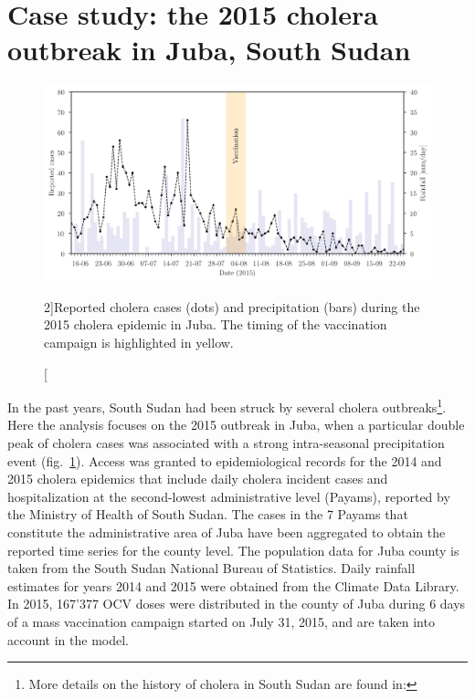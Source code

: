 \section{Case study: the 2015 cholera outbreak in Juba, South Sudan}\label{sec:data sets}
\begin{figure}\centering
  \includegraphics{fig_cholera-rainfall/Lemaitre_ACTROP_2018_42_R1_fig2.png}
  \caption[Cholera cases and precipitation during the 2015 cholera epidemic in Juba][2\baselineskip]{Reported cholera cases (dots) and precipitation (bars) during the 2015 cholera epidemic in Juba. The timing of the vaccination campaign is highlighted in yellow.}\label{fig:report}
\end{figure}
In the past years, South Sudan had been struck by several cholera outbreaks\footnote{More details on the history of cholera in South Sudan are found in: }. Here the analysis focuses on the 2015 outbreak in Juba, when a particular double peak of cholera cases was associated with a strong intra-seasonal precipitation event (fig.~\ref{fig:report}). Access was granted to epidemiological records for the 2014 and 2015 cholera epidemics that include daily cholera incident cases and hospitalization at the second-lowest administrative level (Payams), reported by the Ministry of Health of South Sudan. The cases in the 7 Payams that constitute the administrative area of Juba have been aggregated to obtain the reported time series for the county level. The population data for Juba county is taken from the South Sudan National Bureau of Statistics\cite[-4\baselineskip]{SSNBS:PopulationProjectionsSouth:2015}. Daily rainfall estimates for years 2014 and 2015 were obtained from the Climate Data Library\cite[-3.5\baselineskip][with a resolution of {0.1}$^\circ$, rainfall was averaged over the study area.]{IRI/LDEO:ClimateDataLibrary:2016}. In 2015, 167'377 OCV doses were distributed in the county of Juba during 6 days of a mass vaccination campaign started on July 31, 2015\cite[-3.2\baselineskip]{Abubakar:FirstUseGlobal:2015,Azman:EffectivenessOneDose:2016,Parker:AdaptingGlobalShortage:2017}, and are taken into account in the model.
\newpage
